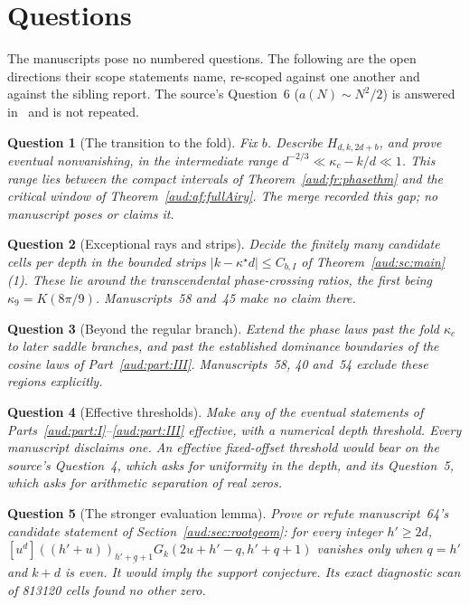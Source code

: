 \documentclass[11pt,a4paper]{article}
\numberwithin{equation}{section}
\newtheorem{question}{Question}
\newcommand{\fall}[2]{(#1)_{\underline{#2}}}
\begin{document}
\section{Questions}\label{aud:sec:questions}
The manuscripts pose no numbered questions. The following are the open directions their scope statements name, re-scoped against one another and against the sibling report. The source's Question~6 ($a(N)\sim N^2/2$) is answered in~\cite{pte} and is not repeated.

\begin{question}[The transition to the fold]\label{aud:q:gap}
Fix $b$. Describe $H_{d,k,2d+b}$, and prove eventual nonvanishing, in the intermediate range $d^{-2/3}\ll\kappa_c-k/d\ll1$. This range lies between the compact intervals of Theorem~\ref{aud:fr:phasethm} and the critical window of Theorem~\ref{aud:af:fullAiry}. The merge recorded this gap; no manuscript poses or claims it.
\end{question}

\begin{question}[Exceptional rays and strips]\label{aud:q:rays}
Decide the finitely many candidate cells per depth in the bounded strips $|k-\kappa^\star d|\le C_{b,I}$ of Theorem~\ref{aud:sc:main}(1). These lie around the transcendental phase-crossing ratios, the first being $\kappa_9=K(8\pi/9)$. Manuscripts~58 and~45 make no claim there.
\end{question}

\begin{question}[Beyond the regular branch]\label{aud:q:beyond}
Extend the phase laws past the fold $\kappa_c$ to later saddle branches, and past the established dominance boundaries of the cosine laws of Part~\ref{aud:part:III}. Manuscripts~58, 40 and~54 exclude these regions explicitly.
\end{question}

\begin{question}[Effective thresholds]\label{aud:q:effective}
Make any of the eventual statements of Parts~\ref{aud:part:I}--\ref{aud:part:III} effective, with a numerical depth threshold. Every manuscript disclaims one. An effective fixed-offset threshold would bear on the source's Question~4, which asks for uniformity in the depth, and its Question~5, which asks for arithmetic separation of real zeros.
\end{question}

\begin{question}[The stronger evaluation lemma]\label{aud:q:evaluation}
Prove or refute manuscript~64's candidate statement of Section~\ref{aud:sec:rootgeom}: for every integer $h'\ge2d$, $[u^d]\fall{(h'+u)}{h'+q+1}G_k(2u+h'-q,h'+q+1)$ vanishes only when $q=h'$ and $k+d$ is even. It would imply the support conjecture. Its exact diagnostic scan of 813120 cells found no other zero.
\end{question}
\end{document}
